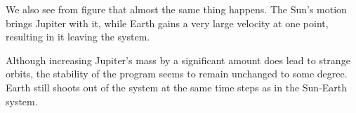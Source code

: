 We also see from figure  that almost the same thing happens.
The Sun's motion brings Jupiter with it, while Earth gains a very large velocity
at one point, resulting in it leaving the system.

Although increasing Jupiter's mass by a significant amount does lead to strange
orbits, the stability of the program seems to remain unchanged to some degree.
Earth still shoots out of the system at the same time steps as in the Sun-Earth
system.

